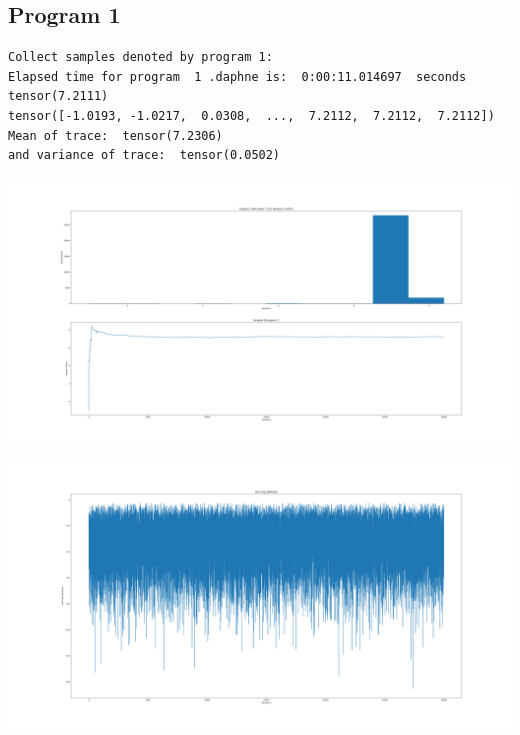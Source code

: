 \documentclass[]{article}
\begin{document}
\subsection{Program 1}
\begin{verbatim}
Collect samples denoted by program 1:
Elapsed time for program  1 .daphne is:  0:00:11.014697  seconds
tensor(7.2111)
tensor([-1.0193, -1.0217,  0.0308,  ...,  7.2112,  7.2112,  7.2112])
Mean of trace:  tensor(7.2306)  
and variance of trace:  tensor(0.0502)	
\end{verbatim}
\begin{center}
	\includegraphics[width=\linewidth]{Figures/p1_IS.png}
\end{center}
\begin{center}
	\includegraphics[width=\linewidth]{Figures/p1_ISjll.png}
\end{center}
\end{document}
